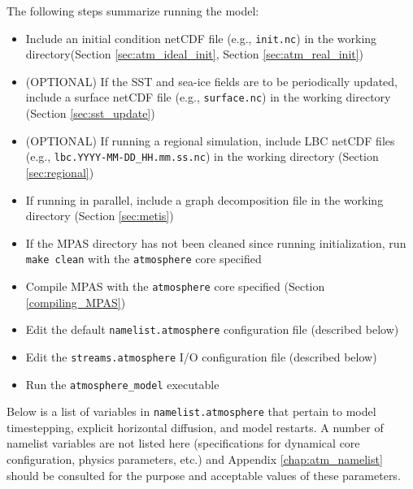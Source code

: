 The following steps summarize running the model:

\begin{itemize}
\item Include an initial condition netCDF file (e.g., {\tt init.nc}) in the working directory(Section \ref{sec:atm_ideal_init}, Section \ref{sec:atm_real_init})
\item (OPTIONAL) If the SST and sea-ice fields are to be periodically updated, include a surface netCDF file (e.g., {\tt surface.nc}) in the working directory (Section \ref{sec:sst_update})
\item (OPTIONAL) If running a regional simulation, include LBC netCDF files (e.g., {\tt lbc.YYYY-MM-DD\_HH.mm.ss.nc}) in the working
directory (Section \ref{sec:regional})
\item If running in parallel, include a graph decomposition file in the working directory (Section \ref{sec:metis})
\item If the MPAS directory has not been cleaned since running initialization, run {\tt make clean} with the {\tt atmosphere} core specified
\item Compile MPAS with the {\tt atmosphere} core specified (Section \ref{compiling_MPAS})
\item Edit the default {\tt namelist.atmosphere} configuration file (described below)
\item Edit the {\tt streams.atmosphere} I/O configuration file (described below)
\item Run the {\tt atmosphere\_model} executable
\end{itemize}

Below is a list of variables in {\tt namelist.atmosphere} that pertain to model timestepping, explicit horizontal diffusion, and model restarts.  A number of namelist variables are not listed here (specifications for dynamical core configuration, physics parameters, etc.) and Appendix \ref{chap:atm_namelist} should be consulted for the purpose and acceptable values of these parameters.

